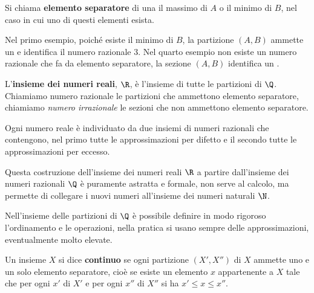 \begin{definizione}{}{}
Si chiama \textbf{elemento separatore} di una  il massimo di \(A\) o il minimo di \(B\), nel caso in cui 
uno di questi elementi esista.
\end{definizione}

Nel primo esempio, poiché esiste il minimo di \(B\), la partizione 
\((A,B)\) ammette un  e identifica il numero 
razionale \(3\).
Nel quarto esempio non esiste un numero razionale che fa da elemento 
separatore, la sezione \((A,B)\) identifica un .

\begin{definizione}{}{}
L'\textbf{insieme dei numeri reali}, \(\R\), è l'insieme di tutte le 
partizioni di \(\Q\). 
Chiamiamo numero razionale le partizioni che ammettono elemento 
separatore, chiamiamo \emph{numero irrazionale} le sezioni che non 
ammettono elemento separatore.
\end{definizione}

Ogni numero reale è individuato da due insiemi di numeri razionali che 
contengono, nel primo tutte le approssimazioni per difetto e il secondo
tutte le approssimazioni per eccesso.


Questa costruzione dell'insieme dei numeri reali \(\R\) a partire 
dall'insieme dei numeri razionali \(\Q\) è puramente astratta e formale, 
non serve al calcolo, ma
permette di collegare i nuovi numeri all'insieme dei numeri naturali \(\N\). 

Nell'insieme delle partizioni di \(\Q\) è possibile definire in modo 
rigoroso l'ordinamento e le operazioni, nella pratica si usano sempre delle 
approssimazioni, eventualmente molto elevate.

\begin{definizione}{}{}
Un insieme \(X\) si dice \textbf{continuo} se ogni 
partizione \((X', X'')\) di \(X\) 
ammette uno e un solo elemento separatore, cioè se esiste un elemento \(x\) 
appartenente a \(X\) tale che per ogni \(x'\) di \(X'\) e per ogni \(x''\) 
di \(X''\) si ha \(x'{\leq}x{\leq}x''\).
\end{definizione}


